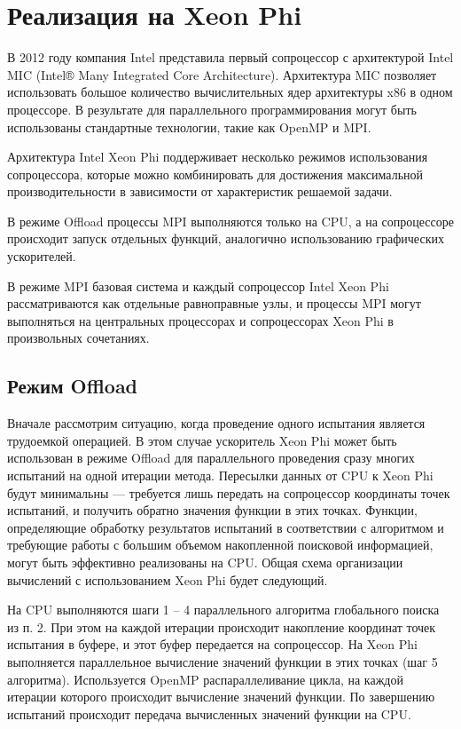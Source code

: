 \documentclass[a4paper]{article}
\begin{document}
\section{Реализация на Xeon Phi}
В 2012 году компания Intel представила первый сопроцессор с архитектурой Intel MIC (Intel® Many Integrated Core Architecture). Архитектура MIC позволяет использовать большое количество вычислительных ядер архитектуры x86 в одном процессоре. В результате для параллельного программирования могут быть использованы стандартные технологии, такие как OpenMP и MPI. 
\par
Архитектура Intel Xeon Phi поддерживает несколько режимов использования сопроцессора, которые можно комбинировать для достижения максимальной производительности в зависимости от характеристик решаемой задачи.
\par
В режиме Offload процессы MPI выполняются только на CPU, а на сопроцессоре происходит запуск отдельных функций, аналогично использованию графических ускорителей.
\par
В режиме MPI базовая система и каждый сопроцессор Intel Xeon Phi рассматриваются как отдельные равноправные узлы, и процессы MPI могут выполняться на центральных процессорах и сопроцессорах Xeon Phi в произвольных сочетаниях.
\subsection{Режим Offload}
Вначале рассмотрим ситуацию, когда проведение одного испытания является трудоемкой операцией. В этом случае ускоритель Xeon Phi может быть использован в режиме Offload для параллельного проведения сразу многих испытаний на одной итерации метода. Пересылки данных от CPU к Xeon Phi будут минимальны --- требуется лишь передать на сопроцессор координаты точек испытаний, и получить обратно значения функции в этих точках. Функции, определяющие обработку результатов испытаний в соответствии с алгоритмом и требующие работы с большим объемом накопленной поисковой информацией, могут быть эффективно реализованы на CPU. Общая схема организации вычислений с использованием Xeon Phi будет следующий.
\par
На CPU выполняются шаги 1 – 4 параллельного алгоритма глобального поиска из п. 2. При этом на каждой итерации происходит накопление координат точек испытания в буфере, и этот буфер передается на сопроцессор. На Xeon Phi выполняется параллельное вычисление значений функции в этих точках (шаг 5 алгоритма). Используется OpenMP распараллеливание цикла, на каждой итерации которого происходит вычисление значений функции. По завершению испытаний происходит передача вычисленных значений функции на CPU. 
\end{document}
